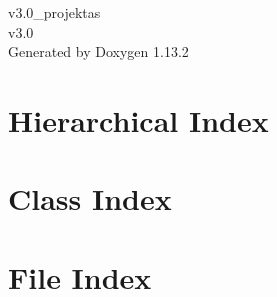 \documentclass[twoside]{book}
\newcommand{\+}{\discretionary{\mbox{\scriptsize$\hookleftarrow$}}{}{}}
\newcommand{\clearemptydoublepage}{%
    \newpage{\pagestyle{empty}\cleardoublepage}%
  }
\begin{document}
  \raggedbottom
    \hypersetup{pageanchor=false,
                bookmarksnumbered=true,
                pdfencoding=unicode
               }
  \begin{titlepage}
  \vspace*{7cm}
  \begin{center}%
  {\Large v3.\+0\+\_\+projektas}\\
  [1ex]\large v3.\+0 \\
  \vspace*{1cm}
  {\large Generated by Doxygen 1.13.2}\\
  \end{center}
  \end{titlepage}
  \clearemptydoublepage
  \tableofcontents
  \clearemptydoublepage
  \hypersetup{pageanchor=true}

\chapter{Hierarchical Index}

\chapter{Class Index}

\chapter{File Index}

\end{document}
